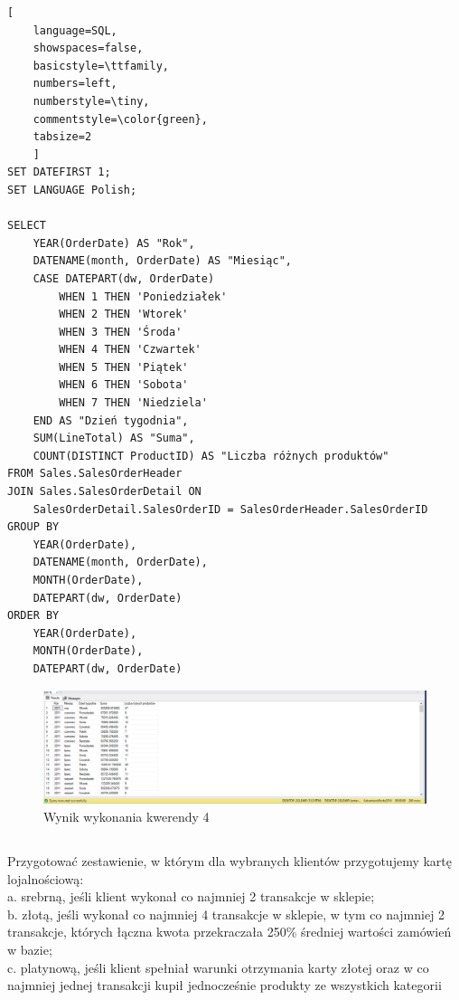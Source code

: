 \documentclass[a4paper,12pt]{article}
\begin{document}
\begin{lstlisting}[
    language=SQL,
    showspaces=false,
    basicstyle=\ttfamily,
    numbers=left,
    numberstyle=\tiny,
    commentstyle=\color{green},
    tabsize=2
    ]
SET DATEFIRST 1;
SET LANGUAGE Polish;

SELECT 
    YEAR(OrderDate) AS "Rok", 
    DATENAME(month, OrderDate) AS "Miesiąc",     
    CASE DATEPART(dw, OrderDate)
        WHEN 1 THEN 'Poniedziałek'
        WHEN 2 THEN 'Wtorek'
        WHEN 3 THEN 'Środa'
        WHEN 4 THEN 'Czwartek'
        WHEN 5 THEN 'Piątek'
        WHEN 6 THEN 'Sobota'
        WHEN 7 THEN 'Niedziela'
    END AS "Dzień tygodnia", 
    SUM(LineTotal) AS "Suma", 
    COUNT(DISTINCT ProductID) AS "Liczba różnych produktów"
FROM Sales.SalesOrderHeader
JOIN Sales.SalesOrderDetail ON 
    SalesOrderDetail.SalesOrderID = SalesOrderHeader.SalesOrderID
GROUP BY 
    YEAR(OrderDate), 
    DATENAME(month, OrderDate),
    MONTH(OrderDate),
    DATEPART(dw, OrderDate)
ORDER BY 
    YEAR(OrderDate), 
    MONTH(OrderDate), 
    DATEPART(dw, OrderDate)
\end{lstlisting}

\begin{figure}[H]
    \centering
    \includegraphics[width=1.0\textwidth]{images/04.png}
    \caption{Wynik wykonania kwerendy 4}
\end{figure}

\subsection{}

Przygotować zestawienie, w którym dla wybranych klientów przygotujemy kartę lojalnościową:\\
a. srebrną, jeśli klient wykonał co najmniej 2 transakcje w sklepie;\\
b. złotą, jeśli wykonał co najmniej 4 transakcje w sklepie, w tym co najmniej 2 transakcje, których łączna kwota przekraczała 250\% średniej wartości zamówień w bazie;\\
c. platynową, jeśli klient spełniał warunki otrzymania karty złotej oraz w co najmniej jednej transakcji kupił jednocześnie produkty ze wszystkich kategorii
\end{document}
